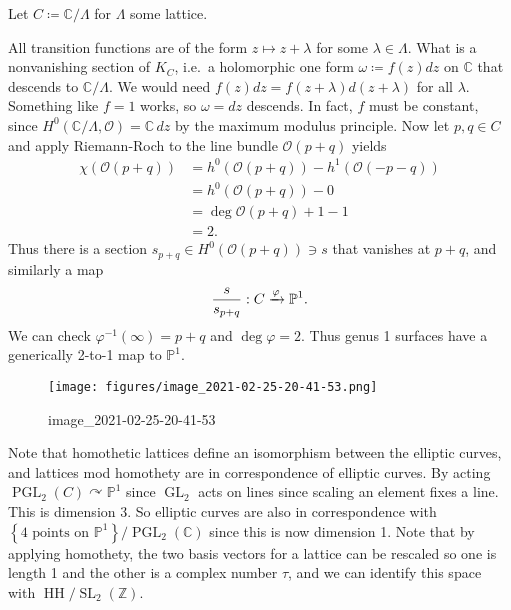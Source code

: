 \begin{example}[?]

Let \(C \coloneqq{\mathbb{C}}/ \Lambda\) for \(\Lambda\) some lattice.

\begin{figure}
\centering
{}
\end{figure}

All transition functions are of the form \(z \mapsto z + \lambda\) for
some \(\lambda\in \Lambda\). What is a nonvanishing section of \(K_C\),
i.e.~a holomorphic one form \(\omega \coloneqq f(z) dz\) on
\({\mathbb{C}}\) that descends to \({\mathbb{C}}/\Lambda\). We would
need \(f(z)dz = f(z + \lambda)d(z+ \lambda)\) for all \(\lambda\).
Something like \(f=1\) works, so \(\omega= dz\) descends. In fact, \(f\)
must be constant, since
\(H^0( {\mathbb{C}}/ \Lambda, {\mathcal{O}}) = {\mathbb{C}}\,dz\) by the
maximum modulus principle. Now let \(p, q\in C\) and apply Riemann-Roch
to the line bundle \({\mathcal{O}}(p+q)\) yields
\begin{align*}
\chi( {\mathcal{O}}(p+q) ) &=
h^0( {\mathcal{O}}(p+q) )-
h^1( {\mathcal{O}}(-p-q) ) \\
&=
h^0( {\mathcal{O}}(p+q) )-0\\
&=
\deg {\mathcal{O}}(p+q)+1-1 \\
&=2
.\end{align*}
Thus there is a section \(s_{p+q} \in H^0( {\mathcal{O}}(p+q)) \ni s\)
that vanishes at \(p+q\), and similarly a map
\begin{align*}
{s\over s_{p+q}}: C \xrightarrow{\varphi} {\mathbb{P}}^1
.\end{align*}
We can check \(\varphi ^{-1} ( \infty ) = p+q\) and
\(\deg \varphi = 2\). Thus genus 1 surfaces have a generically 2-to-1
map to \({\mathbb{P}}^1\).

\begin{figure}
\centering
\texttt{[image: figures/image\_2021-02-25-20-41-53.png]}
\caption{image\_2021-02-25-20-41-53}
\end{figure}

Note that homothetic lattices define an isomorphism between the elliptic
curves, and lattices mod homothety are in correspondence of elliptic
curves. By acting
\(\operatorname{PGL}_2(C) \curvearrowright{\mathbb{P}}^1\) since
\(\operatorname{GL}_2\) acts on lines since scaling an element fixes a
line. This is dimension 3. So elliptic curves are also in correspondence
with
\(\left\{{ 4 \text{ points on } {\mathbb{P}}^1}\right\} / \operatorname{PGL}_2({\mathbb{C}})\)
since this is now dimension 1. Note that by applying homothety, the two
basis vectors for a lattice can be rescaled so one is length 1 and the
other is a complex number \(\tau\), and we can identify this space with
\({\operatorname{HH}}/ {\operatorname{SL}}_2({\mathbb{Z}})\).

\end{example}

